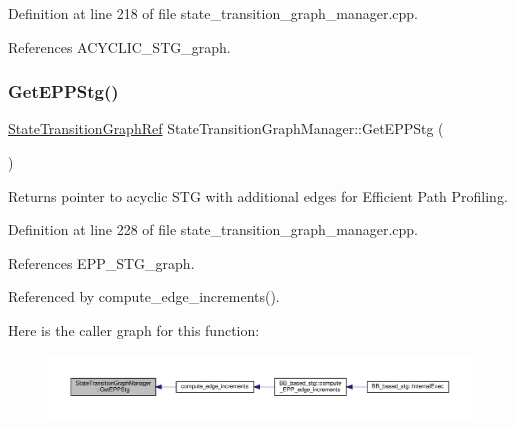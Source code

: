 Definition at line 218 of file state\+\_\+transition\+\_\+graph\+\_\+manager.\+cpp.



References A\+C\+Y\+C\+L\+I\+C\+\_\+\+S\+T\+G\+\_\+graph.

\mbox{\label{classStateTransitionGraphManager_a7f939e362163b1e4bb6308cc3f0bbfb7}} 
\subsubsection{\texorpdfstring{Get\+E\+P\+P\+Stg()}{GetEPPStg()}}
{\footnotesize\ttfamily \hyperlink{state__transition__graph_8hpp_a50ba60cd5e113de254d5d7638bbbba86}{State\+Transition\+Graph\+Ref} State\+Transition\+Graph\+Manager\+::\+Get\+E\+P\+P\+Stg (\begin{DoxyParamCaption}{ }\end{DoxyParamCaption})}



Returns pointer to acyclic S\+TG with additional edges for Efficient Path Profiling. 



Definition at line 228 of file state\+\_\+transition\+\_\+graph\+\_\+manager.\+cpp.



References E\+P\+P\+\_\+\+S\+T\+G\+\_\+graph.



Referenced by compute\+\_\+edge\+\_\+increments().

Here is the caller graph for this function\+:
\nopagebreak
\begin{figure}[H]
\begin{center}
\leavevmode
\includegraphics[width=350pt]{d9/dfd/classStateTransitionGraphManager_a7f939e362163b1e4bb6308cc3f0bbfb7_icgraph}
\end{center}
\end{figure}
\mbox{\label{classStateTransitionGraphManager_a320b30fff409b26d2075dd4a028688db}} 
